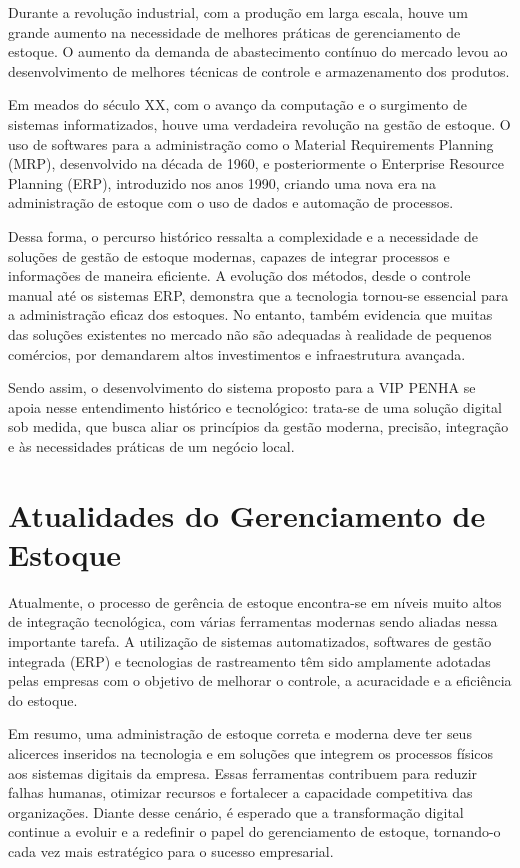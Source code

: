 \documentclass[
	12pt,				%
	openany,			%
	twoside,			%
	a4paper,			%
	english,			%
	brazil				%
	]{abntex2}
\begin{document}
Durante a revolução industrial, com a produção em larga escala, houve um grande aumento na necessidade de melhores práticas de gerenciamento de estoque. O aumento da demanda de abastecimento contínuo do mercado levou ao desenvolvimento de melhores técnicas de controle e armazenamento dos produtos. \cite{DIAS2021}

Em meados do século XX, com o avanço da computação e o surgimento de sistemas informatizados, houve uma verdadeira revolução na gestão de estoque. O uso de softwares para a administração como o Material Requirements Planning (MRP), desenvolvido na década de 1960, e posteriormente o Enterprise Resource Planning (ERP), introduzido nos anos 1990, criando uma nova era na administração de estoque com o uso de dados e automação de processos.

Dessa forma, o percurso histórico ressalta a complexidade e a necessidade de soluções de gestão de estoque modernas, capazes de integrar processos e informações de maneira eficiente. A evolução dos métodos, desde o controle manual até os sistemas ERP, demonstra que a tecnologia tornou-se essencial para a administração eficaz dos estoques. No entanto, também evidencia que muitas das soluções existentes no mercado não são adequadas à realidade de pequenos comércios, por demandarem altos investimentos e infraestrutura avançada.

Sendo assim, o desenvolvimento do sistema proposto para a VIP PENHA se apoia nesse entendimento histórico e tecnológico: trata-se de uma solução digital sob medida, que busca aliar os princípios da gestão moderna, precisão, integração e às necessidades práticas de um negócio local. 

\section{Atualidades do Gerenciamento de Estoque}
Atualmente, o processo de gerência de estoque encontra-se em níveis muito altos de integração tecnológica, com várias ferramentas modernas sendo aliadas nessa importante tarefa. A utilização de sistemas automatizados, softwares de gestão integrada (ERP) e tecnologias de rastreamento têm sido amplamente adotadas pelas empresas com o objetivo de melhorar o controle, a acuracidade e a eficiência do estoque.

Em resumo, uma administração de estoque correta e moderna deve ter seus alicerces inseridos na tecnologia e em soluções que integrem os processos físicos aos sistemas digitais da empresa. Essas ferramentas contribuem para reduzir falhas humanas, otimizar recursos e fortalecer a capacidade competitiva das organizações. Diante desse cenário, é esperado que a transformação digital continue a evoluir e a redefinir o papel do gerenciamento de estoque, tornando-o cada vez mais estratégico para o sucesso empresarial.
\end{document}
